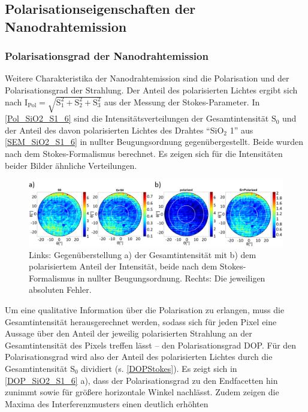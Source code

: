 \subsection{Polarisationseigenschaften der Nanodrahtemission}
\label{PolGradSiO2} \subsubsection{Polarisationsgrad der Nanodrahtemission}
Weitere Charakteristika der Nanodrahtemission sind die Polarisation und der
Polarisationsgrad der Strahlung. Der Anteil des polarisierten Lichtes ergibt
sich nach
$\text{I}_\text{Pol}=\sqrt{\text{S}_\text{1}^\text{2}+\text{S}_\text{2}^\text{2}+\text{S}_\text{3}^\text{2}}$
aus der Messung der Stokes-Parameter. In \autoref{Pol_SiO2_S1_6} sind die
Intensitätsverteilungen der Gesamtintensität $\text{S}_\text{0}$  und der Anteil
des davon polarisierten Lichtes des Drahtes ``SiO$_\text{2}$ 1'' aus
\autoref{SEM_SiO2_S1_6} in nullter Beugungsordnung gegenübergestellt. Beide
wurden nach dem Stokes-Formalismus berechnet. Es zeigen sich für die
Intensitäten beider Bilder ähnliche Verteilungen.\begin{figure}[b] \centering
\includegraphics[width=1\textwidth]{Bilder/SiO2/Pol_SiO2_S1_6} \caption{Links:
Gegenüberstellung a) der Gesamtintensität mit b) dem polarisiertem Anteil der
Intensität, beide nach dem Stokes-Formalismus in nullter Beugungsordnung.
Rechts: Die jeweiligen absoluten Fehler.} \label{Pol_SiO2_S1_6} \end{figure}Um
eine qualitative Information über die Polarisation zu erlangen, muss die
Gesamtintensität herausgerechnet werden, sodass sich für jeden Pixel eine
Aussage über den Anteil der jeweilig polarisierten Strahlung an der
Gesamtintensität des Pixels treffen lässt – den Polarisationsgrad DOP. Für den
Polarisationsgrad wird also der Anteil des polarisierten Lichtes durch die
Gesamtintensität S$_\text{0}$ dividiert (s. \autoref{DOPStokes}). Es zeigt sich
in \autoref{DOP_SiO2_S1_6} a), dass der Polarisationsgrad zu den Endfacetten hin
zunimmt sowie für größere horizontale Winkel nachlässt. Zudem zeigen die Maxima
des Interferenzmusters einen deutlich erhöhten
